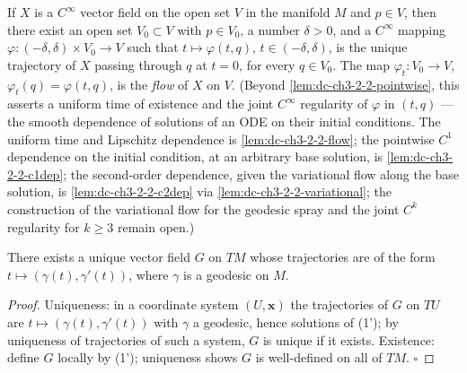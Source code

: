 \begin{theorem}
  \label{thm:dc-ch3-2-2}
  \notready
  If $X$ is a $C^\infty$ vector field on the open set $V$ in the manifold $M$ and
  $p\in V$, then there exist an open set $V_0\subset V$ with $p\in V_0$, a number
  $\delta>0$, and a $C^\infty$ mapping $\varphi:(-\delta,\delta)\times V_0\to V$ such
  that $t\mapsto\varphi(t,q)$, $t\in(-\delta,\delta)$, is the unique trajectory of
  $X$ passing through $q$ at $t=0$, for every $q\in V_0$. The map
  $\varphi_t:V_0\to V$, $\varphi_t(q)=\varphi(t,q)$, is the \emph{flow} of $X$ on $V$.
  (Beyond \cref{lem:dc-ch3-2-2-pointwise}, this asserts a uniform time of
  existence and the joint $C^\infty$ regularity of $\varphi$ in $(t,q)$ — the
  smooth dependence of solutions of an ODE on their initial conditions. The
  uniform time and Lipschitz dependence is \cref{lem:dc-ch3-2-2-flow}; the
  pointwise $C^1$ dependence on the initial condition, at an arbitrary base
  solution, is \cref{lem:dc-ch3-2-2-c1dep}; the second-order dependence, given
  the variational flow along the base solution, is \cref{lem:dc-ch3-2-2-c2dep}
  via \cref{lem:dc-ch3-2-2-variational}; the construction of the variational
  flow for the geodesic spray and the joint $C^k$ regularity for $k \ge 3$
  remain open.)
\end{theorem}

\begin{lemma}
  \label{lem:dc-ch3-2-3}
  \notready
  There exists a unique vector field $G$ on $TM$ whose trajectories are of the form
  $t\mapsto(\gamma(t),\gamma'(t))$, where $\gamma$ is a geodesic on $M$.
\end{lemma}
\begin{proof}
  Uniqueness: in a coordinate system $(U,\mathbf{x})$ the trajectories of
  $G$ on $TU$ are $t\mapsto(\gamma(t),\gamma'(t))$ with $\gamma$ a geodesic, hence
  solutions of (1'); by uniqueness of trajectories of such a system, $G$ is unique
  if it exists. Existence: define $G$ locally by (1'); uniqueness shows $G$ is
  well-defined on all of $TM$. $\square$
\end{proof}

